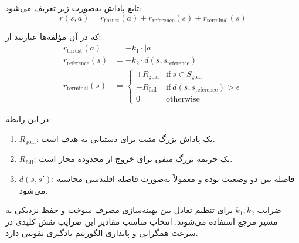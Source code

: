 تابع پاداش به‌صورت زیر تعریف می‌شود:
\[
r(s, a) = r_{\text{thrust}}(a) + r_{\text{reference}}(s) + r_{\text{terminal}}(s)
\]

که در آن مؤلفه‌ها عبارتند از:
\begin{align}
	r_{\text{thrust}}(a) &= -k_1 \cdot |a| \\
	r_{\text{reference}}(s) &= -k_2 \cdot d(s, s_{\text{reference}}) \\
	r_{\text{terminal}}(s) &= 
	\begin{cases}
		+R_{\text{goal}} & \text{if} ~ s \in S_{\text{goal}} \\
		-R_{\text{fail}} & \text{if} ~ d(s, s_{\text{reference}}) > \epsilon \\
		0 & \text{otherwise}
	\end{cases}
\end{align}

در این رابطه:  
\begin{enumerate}
	\item \(R_{\text{goal}}\): یک پاداش بزرگ مثبت برای دستیابی به هدف است.
	\item \(R_{\text{fail}}\): یک جریمه بزرگ منفی برای خروج از محدوده مجاز است.
	\item \(d(s, s')\): فاصله بین دو وضعیت بوده و معمولاً به‌صورت فاصله اقلیدسی محاسبه می‌شود.
\end{enumerate}


ضرایب \(k_1, k_2\) برای تنظیم تعادل بین بهینه‌سازی مصرف سوخت و حفظ نزدیکی به مسیر مرجع استفاده می‌شوند. انتخاب مناسب مقادیر این ضرایب نقش کلیدی در سرعت همگرایی و پایداری الگوریتم یادگیری تقویتی دارد.  







